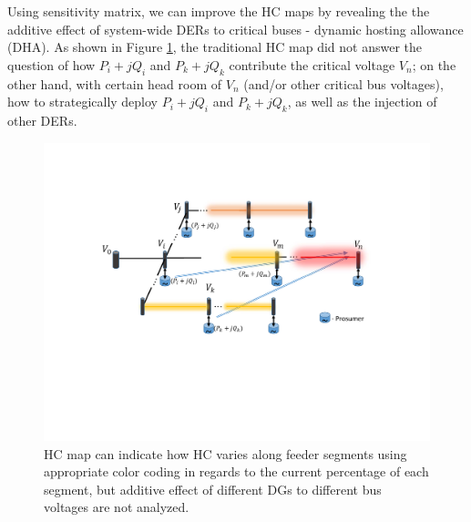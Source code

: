 \documentclass{article}
\begin{document}
Using sensitivity matrix, we can improve the HC maps \cite{ismael2019state} by revealing the the additive effect of system-wide DERs to critical buses - dynamic hosting allowance (DHA). As shown in Figure \ref{fig:hcmap}, the traditional HC map did not answer the question of
how $P_i+jQ_i$ and $P_k+jQ_k$ contribute the critical voltage $V_n$; on the other hand, with certain head room of $V_n$ (and/or other critical bus voltages), how to strategically deploy $P_i+jQ_i$ and $P_k+jQ_k$, as well as the injection of other DERs. 
\begin{figure}[h!]
    \centering
    \includegraphics[width=0.75\linewidth]{pics/hcmap.pdf}
    \caption{HC map can indicate how HC varies along feeder segments using appropriate color coding in regards to the current percentage of each segment, but additive effect of different DGs to different bus voltages are not analyzed.}
    \label{fig:hcmap}
\end{figure}
\end{document}
